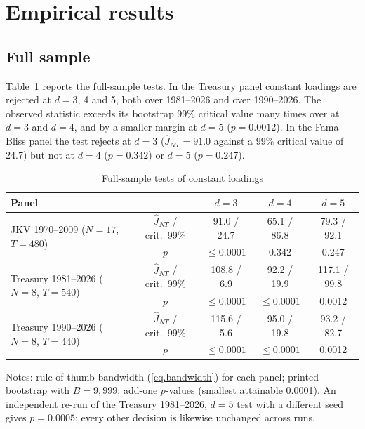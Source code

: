 \documentclass[11pt]{article}
\begin{document}
\section{Empirical results}\label{sec.results}

\subsection{Full sample}

Table~\ref{tab.full} reports the full-sample tests. In the Treasury panel constant loadings are rejected at $d=3$, 4 and 5, both over 1981--2026 and over 1990--2026. The observed statistic exceeds its bootstrap 99\% critical value many times over at $d=3$ and $d=4$, and by a smaller margin at $d=5$ ($p=0.0012$). In the Fama--Bliss panel the test rejects at $d=3$ ($\hat J_{NT}=91.0$ against a 99\% critical value of 24.7) but not at $d=4$ ($p=0.342$) or $d=5$ ($p=0.247$).

\begin{table}[htbp]
\centering
\begin{threeparttable}
\small
\caption{Full-sample tests of constant loadings}\label{tab.full}
\begin{tabular}{lcccc}
\toprule
Panel & & $d=3$ & $d=4$ & $d=5$\\
\midrule
\multirow{2}{*}{JKV 1970--2009 ($N=17$, $T=480$)} & $\hat J_{NT}$ / crit.\ 99\% & 91.0 / 24.7 & 65.1 / 86.8 & 79.3 / 92.1\\
 & $p$ & $\le 0.0001$ & 0.342 & 0.247\\[3pt]
\multirow{2}{*}{Treasury 1981--2026 ($N=8$, $T=540$)} & $\hat J_{NT}$ / crit.\ 99\% & 108.8 / 6.9 & 92.2 / 19.9 & 117.1 / 99.8\\
 & $p$ & $\le 0.0001$ & $\le 0.0001$ & 0.0012\\[3pt]
\multirow{2}{*}{Treasury 1990--2026 ($N=8$, $T=440$)} & $\hat J_{NT}$ / crit.\ 99\% & 115.6 / 5.6 & 95.0 / 19.8 & 93.2 / 82.7\\
 & $p$ & $\le 0.0001$ & $\le 0.0001$ & 0.0012\\
\bottomrule
\end{tabular}
\begin{tablenotes}\small
\item Notes: rule-of-thumb bandwidth (\ref{eq.bandwidth}) for each panel; printed bootstrap with $B=9{,}999$; add-one $p$-values (smallest attainable 0.0001). An independent re-run of the Treasury 1981--2026, $d=5$ test with a different seed gives $p=0.0005$; every other decision is likewise unchanged across runs. 
\end{tablenotes}
\end{threeparttable}
\end{table}
\end{document}
